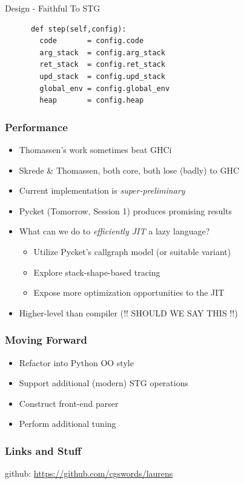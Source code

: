 \documentclass[xetex,serif,mathserif]{beamer}
\newenvironment{slide}[1]{\begin{frame}\frametitle{#1}}{\end{frame}}
\begin{document}
\begin{frame}[fragile]{Design - Faithful To STG}
  \begin{center}
    \begin{verbatim}
      def step(self,config):
        code       = config.code
        arg_stack  = config.arg_stack
        ret_stack  = config.ret_stack
        upd_stack  = config.upd_stack
        global_env = config.global_env
        heap       = config.heap
    \end{verbatim}
  \end{center}
\end{frame}

\begin{slide}{Performance}
  \begin{itemize}
    \item Thomassen's work sometimes beat GHCi
    \item Skrede \& Thomassen, both core, both lose (badly) to GHC
    \item Current implementation is \emph{super-preliminary}
    \item Pycket (Tomorrow, Session 1) produces promising results
    \item What can we do to \emph{efficiently JIT} a lazy language?
    \begin{itemize}
      \item Utilize Pycket's callgraph model (or suitable variant)
      \item Explore stack-shape-based tracing
      \item Expose more optimization opportunities to the JIT
    \end{itemize}
    \item Higher-level than compiler  (!! SHOULD WE SAY THIS !!)
  \end{itemize}
\end{slide}

\begin{slide}{Moving Forward}
  \begin{itemize}
    \item Refactor into Python OO style
    \item Support additional (modern) STG operations
    \item Construct front-end parser
    \item Perform additional tuning
  \end{itemize}
\end{slide}

\begin{slide}{Links and Stuff}
    \begin{center}
        github: \href{https://github.com/cgswords/laurens}{https://github.com/cgswords/laurens}
    \end{center}
\end{slide}
\end{document}

